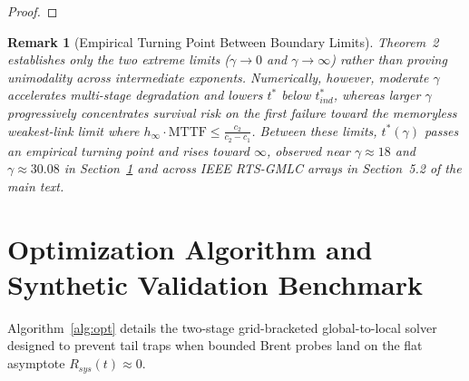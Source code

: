 \documentclass[10pt,a4paper]{article}
\newtheorem{remark}{Remark}
\begin{document}
\begin{proof}
\end{proof}

\begin{remark}[Empirical Turning Point Between Boundary Limits]
Theorem~2 establishes only the two extreme limits ($\gamma \to 0$ and $\gamma \to \infty$) rather than proving unimodality across intermediate exponents. Numerically, however, moderate $\gamma$ accelerates multi-stage degradation and lowers $t^*$ below $t_{ind}^*$, whereas larger $\gamma$ progressively concentrates survival risk on the first failure toward the memoryless weakest-link limit where $h_\infty \cdot \mathrm{MTTF} \le \frac{c_2}{c_2-c_1}$. Between these limits, $t^*(\gamma)$ passes an empirical turning point and rises toward $\infty$, observed near $\gamma \approx 18$ and $\gamma \approx 30.08$ in Section~\ref{sec:S2} and across IEEE RTS-GMLC arrays in Section~5.2 of the main text.
\end{remark}

\section{Optimization Algorithm and Synthetic Validation Benchmark}
\label{sec:S2}

Algorithm~\ref{alg:opt} details the two-stage grid-bracketed global-to-local solver designed to prevent tail traps when bounded Brent probes land on the flat asymptote $R_{sys}(t) \approx 0$.
\end{document}
